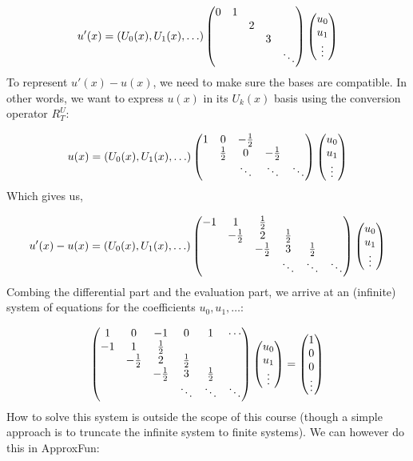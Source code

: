 \documentclass[12pt,a4paper]{article}
\def\half{ {1 \over 2} }
\begin{document}
\[
u'(x) = (U_0(x),U_1(x),\ldots) \begin{pmatrix}
0 & 1 \cr
&& 2 \cr
&&& 3 \cr
&&&&\ddots
\end{pmatrix}\begin{pmatrix} u_0\\u_1\\\vdots \end{pmatrix}
\]
To represent $u'(x) - u(x)$, we need to make sure the bases are compatible. In other words, we want to express $u(x)$ in its $U_k(x)$ basis using the conversion operator $R_T^{U}$:

\[
u(x) = (U_0(x),U_1(x),\ldots) \begin{pmatrix}
    1 &0 & -\half \cr
& \half & 0 & -\half \cr
&&\ddots & \ddots & \ddots
\end{pmatrix}\begin{pmatrix} u_0\\u_1\\\vdots \end{pmatrix}
\]
Which gives us,

\[
u'(x) - u(x) =  (U_0(x),U_1(x),\ldots)  \begin{pmatrix}
    -1 &1 & \half \cr
& -\half & 2 & \half \cr
&& -\half & 3 & \half \cr
&&&\ddots & \ddots & \ddots
\end{pmatrix} \begin{pmatrix} u_0\\u_1\\\vdots \end{pmatrix}
\]
Combing the differential part and the evaluation part, we arrive at an (infinite) system of equations for the coefficients $u_0,u_1,\dots$:

\[
\begin{pmatrix}
      1 & 0 & -1 & 0 & 1 & \cdots \\
    -1 &1 & \half \cr
& -\half & 2 & \half \cr
&& -\half & 3 & \half \cr
&&&\ddots & \ddots & \ddots
\end{pmatrix} \begin{pmatrix} u_0\\u_1\\\vdots \end{pmatrix}  = \begin{pmatrix} 1 \\ 0 \\ 0 \\ \vdots \end{pmatrix}
\]
How to solve this system is outside the scope of this course (though a simple approach is to truncate the infinite system to finite systems). We can however do this in ApproxFun:
\end{document}
